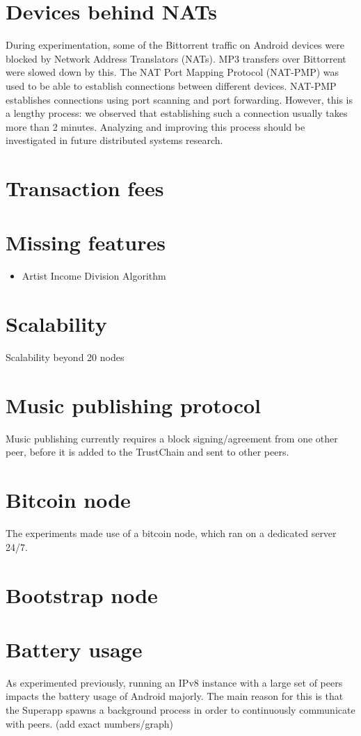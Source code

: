 \section{Devices behind NATs}
During experimentation, some of the Bittorrent traffic on Android devices were blocked by Network Address  Translators (NATs). MP3 transfers over Bittorrent were slowed down by this. The NAT Port Mapping Protocol (NAT-PMP) was used to be able to establish connections between different devices. NAT-PMP establishes connections using port scanning and port forwarding. However, this is a lengthy process: we observed that establishing such a connection usually takes more than 2 minutes. Analyzing and improving this process should be investigated in future distributed systems research.

\section{Transaction fees}

\section{Missing features}
\begin{itemize}
    \item Artist Income Division Algorithm
\end{itemize}
\section{Scalability}
Scalability beyond 20 nodes
\section{Music publishing protocol}
Music publishing currently requires a block signing/agreement from one other peer, before it is added to the TrustChain and sent to other peers.  
\section{Bitcoin node}
The experiments made use of a bitcoin node, which ran on a dedicated server 24/7.
\section{Bootstrap node}
\section{Battery usage}
As \citep{mattskala2020} experimented previously, running an IPv8 instance with a large set of peers impacts the battery usage of Android majorly. The main reason for this is that the Superapp spawns a background process in order to continuously communicate with peers. (add exact numbers/graph)
